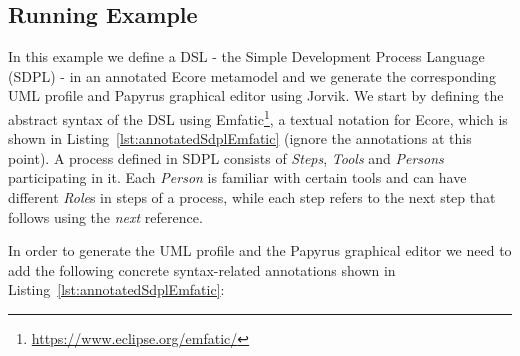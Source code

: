 \subsection{Running Example}
\label{sec:example}
In this example we define a DSL - the Simple Development Process Language (SDPL) - in an annotated Ecore metamodel and we generate the corresponding UML profile and Papyrus graphical editor using Jorvik.
We start by defining the abstract syntax of the DSL using  Emfatic\footnote{\url{https://www.eclipse.org/emfatic/}}, a textual notation for Ecore, which is shown in Listing~\ref{lst:annotatedSdplEmfatic} (ignore the annotations at this point). 
A process defined in SDPL consists of \textit{Steps}, \textit{Tools} and \textit{Persons} participating in it. 
Each \textit{Person} is familiar with certain tools and can have different \textit{Role}s in steps of a process, while each step refers to the next step that follows using the \textit{next} reference.

In order to generate the UML profile and the Papyrus graphical editor we need to add the following concrete syntax-related annotations shown in Listing~\ref{lst:annotatedSdplEmfatic}:

